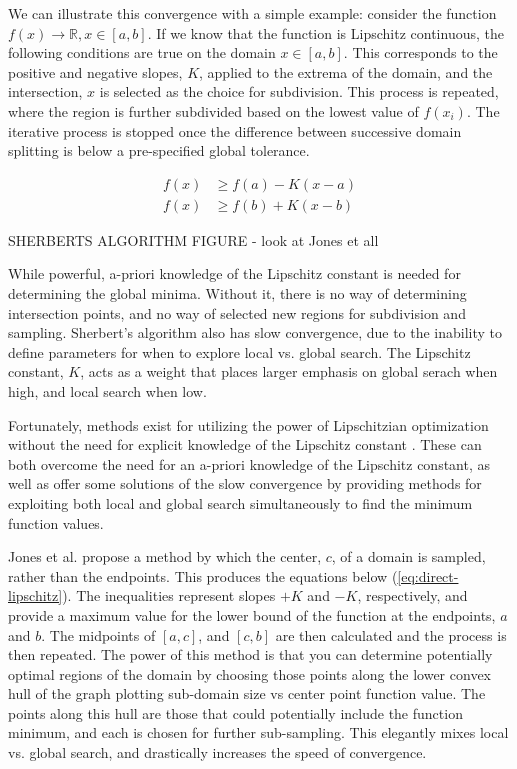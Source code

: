 We can illustrate this convergence with a simple example: consider the function $f(x) \rightarrow \mathbb{R}, x \in [a,b]$. If we know that the function is Lipschitz continuous, the following conditions are true on the domain $x\in[a,b]$. This corresponds to the positive and negative slopes, $K$, applied to the extrema of the domain, and the intersection, $x$ is selected as the choice for subdivision. This process is repeated, where the region is further subdivided based on the lowest value of $f(x_i)$. The iterative process is stopped once the difference between successive domain splitting is below a pre-specified global tolerance. 

\begin{equation}
    \begin{aligned}
        f(x) &\ge f(a) - K(x - a) \\
        f(x) &\ge f(b) + K(x - b)
    \end{aligned}
    \label{eq:sherbert}
\end{equation}

\begin{center}
    \Huge{SHERBERTS ALGORITHM FIGURE - look at Jones et all}
\end{center}

While powerful, a-priori knowledge of the Lipschitz constant is needed for determining the global minima. Without it, there is no way of determining intersection points, and no way of selected new regions for subdivision and sampling. Sherbert's algorithm also has slow convergence, due to the inability to define parameters for when to explore local vs. global search. The Lipschitz constant, $K$, acts as a weight that places larger emphasis on global serach when high, and local search when low. 

Fortunately, methods exist for utilizing the power of Lipschitzian optimization without the need for explicit knowledge of the Lipschitz constant \cite{jonesLipschitzianOptimizationLipschitz1993}. These can both overcome the need for an a-priori knowledge of the Lipschitz constant, as well as offer some solutions of the slow convergence by providing methods for exploiting both local and global search simultaneously to find the minimum function values.

Jones et al. \cite{jonesLipschitzianOptimizationLipschitz1993} propose a method by which the center, $c$, of a domain is sampled, rather than the endpoints. This produces the equations below (\cref{eq:direct-lipschitz}). The inequalities represent slopes $+K$ and $-K$, respectively, and provide a maximum value for the lower bound of the function at the endpoints, $a$ and $b$. The midpoints of $[a,c]$, and $[c,b]$ are then calculated and the process is then repeated. The power of this method is that you can determine potentially optimal regions of the domain by choosing those points along the lower convex hull of the graph plotting sub-domain size vs center point function value. The points along this hull are those that could potentially include the function minimum, and each is chosen for further sub-sampling. This elegantly mixes local vs. global search, and drastically increases the speed of convergence.

